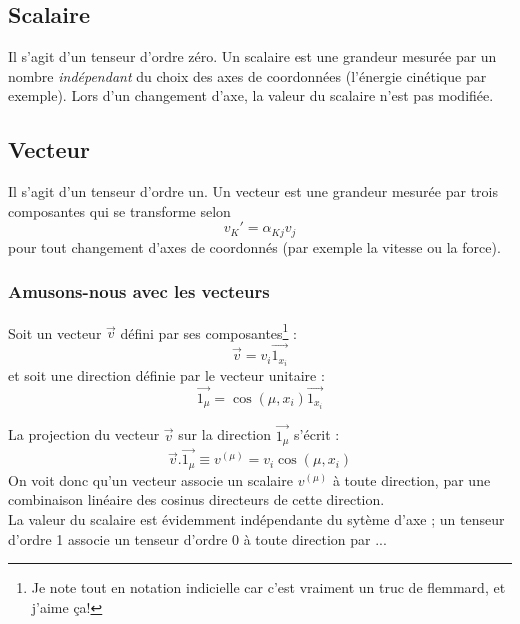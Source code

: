     \subsection{Scalaire}
    Il s'agit d'un tenseur d'ordre zéro. Un scalaire est une grandeur mesurée par un nombre 
    \textit{indépendant} du choix des axes de coordonnées (l'énergie cinétique par exemple). Lors d'un
    changement d'axe, la valeur du scalaire n'est pas modifiée.

    \subsection{Vecteur}
    Il s'agit d'un tenseur d'ordre un. Un vecteur est une grandeur mesurée par trois composantes qui
    se transforme selon
    \begin{equation}
    v_K' = \alpha_{Kj}v_j
    \end{equation}
    pour tout changement d'axes de coordonnés (par exemple la vitesse ou la force).

    
        \subsubsection{Amusons-nous avec les vecteurs}
        Soit un vecteur $\vec{v}$ défini par ses composantes\footnote{Je note tout en notation indicielle
        car c'est vraiment un truc de flemmard, et j'aime ça!} :
        \begin{equation}
        \vec{v} = v_i\vec{1_{x_i}}
        \end{equation}
        et soit une direction définie par le vecteur unitaire :
        \begin{equation}
        \vec{1_\mu} = \cos(\mu,x_i)\vec{1_{x_i}}
        \end{equation}
        
        La projection du vecteur $\vec{v}$ sur la direction $\vec{1_\mu}$ s'écrit :
        \begin{equation}
        \vec{v}.\vec{1_\mu} \equiv v^{(\mu)} = v_i\cos(\mu, x_i)
        \end{equation}
     On voit donc qu'un vecteur associe un scalaire $v^{(\mu)}$ à toute direction, par une combinaison
    linéaire des cosinus directeurs de cette direction.\\
    La valeur du scalaire est évidemment indépendante du sytème d'axe ; un tenseur d'ordre 1 associe un 
    tenseur d'ordre 0 à toute direction par ...
        
        
        
